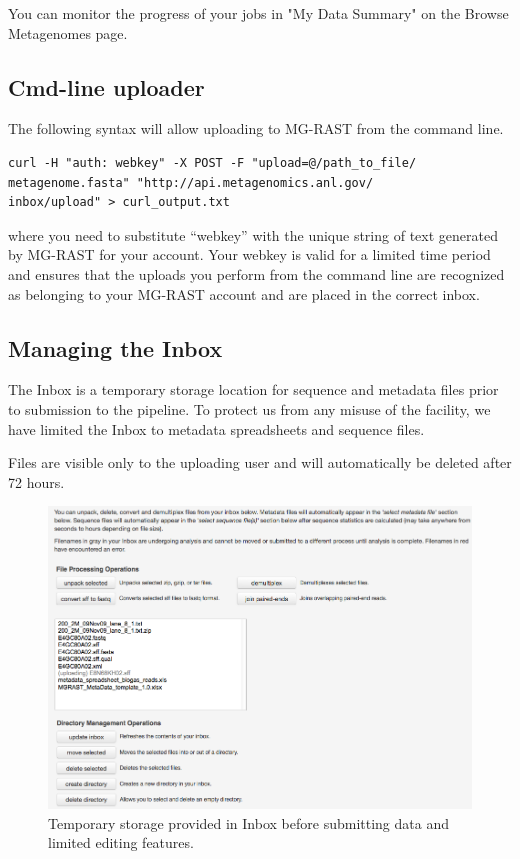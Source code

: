 \documentclass[12pt,fullpage]{report}
\begin{document}
You can monitor the progress of your jobs in "My Data Summary" on the Browse Metagenomes page.

\subsection{Cmd-line uploader}

The following syntax will allow uploading to MG-RAST from the command line.

\begin{verbatim}
curl -H "auth: webkey" -X POST -F "upload=@/path_to_file/
metagenome.fasta" "http://api.metagenomics.anl.gov/
inbox/upload" > curl_output.txt
\end{verbatim}
where you need to substitute ``webkey'' with the unique string of text generated by MG-RAST for your account. Your webkey is valid for a limited time period and ensures that the uploads you perform from the command line are recognized as belonging to your MG-RAST account and are placed in the correct inbox.


\subsection{Managing the Inbox}

The Inbox is a temporary storage location for sequence and metadata files prior to submission to the pipeline. To protect us from any
misuse of the facility, we have limited the Inbox to metadata spreadsheets and sequence files.

Files are visible only to the uploading user and will automatically be deleted after 72 hours.

\begin{figure}
\begin{center}
\includegraphics[width=6in]{Images/Inbox.png}
\end{center}
\caption{
Temporary storage provided in Inbox before submitting data and limited editing features.
}
\label{fig:Inbox}
\end{figure}
\end{document}
